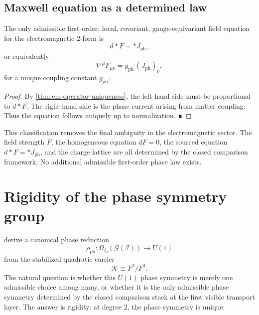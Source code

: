 \subsection{Maxwell equation as a determined law}
\begin{corollary}
	The only admissible first-order, local, covariant, gauge-equivariant
	field equation for the electromagnetic $2$-form is
	\[
		d{*}F = {*}J_{\mathrm{ph}},
	\]
	or equivalently
	\[
		\nabla^\mu F_{\mu\nu} = g_{\mathrm{ph}}\, (J_{\mathrm{ph}})_\nu,
	\]
	for a unique coupling constant $g_{\mathrm{ph}}$.
\end{corollary}
\begin{proof}
	By \cref{thm:em-operator-uniqueness}, the left-hand side must be
	proportional to $d{*}F$.
	The right-hand side is the phase current arising from matter coupling.
	Thus the equation follows uniquely up to normalization. ∎
\end{proof}
\begin{remark}
	This classification removes the final ambiguity in the electromagnetic
	sector.
	The field strength $F$, the homogeneous equation $dF=0$, the sourced
	equation $d{*}F={*}J_{\mathrm{ph}}$, and the charge lattice are all
	determined by the
	closed comparison framework.
	No additional admissible first-order phase law exists.
\end{remark}
\section{Rigidity of the phase symmetry group}
\label{sec:phase-group-rigidity}
derive a canonical phase reduction
\[
	\rho_{\mathrm{ph}}:\Omega_{i_0}(\mathcal G(\mathcal I))\to U(1)
\]
from the stabilized quadratic carrier
\[
	\mathcal K \cong F^2/F^3.
\]
The natural question is whether this $U(1)$ phase symmetry is merely one
admissible choice among many, or whether it is the only admissible phase
symmetry determined by the closed comparison stack at the first visible
transport layer.
The answer is rigidity: at degree $2$, the phase symmetry is unique.
